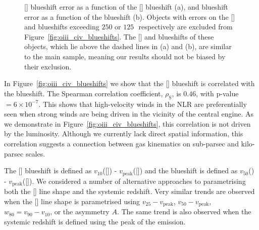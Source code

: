 \begin{figure}
\captionsetup[subfigure]{labelformat=empty}
\centering 
    \subfloat[\label{fig:oiii_civ_blueshifts_a}]{}
    \subfloat[\label{fig:oiii_civ_blueshifts_b}]{}
    \caption[{Objects excluded from Figure~\ref{fig:oiii_civ_blueshifts}.}]{[] blueshift error as a function of the [] blueshift (a), and  blueshift error as a function of the  blueshift (b). Objects with errors on the [] and  blueshifts exceeding $250$ or $125$\,\kms\, respectively are excluded from Figure~\ref{fig:oiii_civ_blueshifts}. The [] and  blueshifts of these objects, which lie above the dashed lines in (a) and (b), are similar to the main sample, meaning our results should not be biased by their exclusion.}
    \label{fig:oiii_civ_blueshifts_flagged}
\end{figure}

In Figure~\ref{fig:oiii_civ_blueshifts} we show that the [] blueshift is correlated with the  blueshift.
The Spearman correlation coefficient, $\rho_{\text{S}}$, is $0.46$, with p-value $=6\times10^{-7}$. 
This shows that high-velocity winds in the NLR are preferentially seen when strong winds are being driven in the vicinity of the central engine. 
As we demonstrate in Figure~\ref{fig:oiii_civ_blueshifts}, this correlation is not driven by the luminosity. 
Although we currently lack direct spatial information, this correlation suggests a connection between gas kinematics on sub-parsec and kilo-parsec scales. 

The [] blueshift is defined as $v_{10}$([]) - $v_{\text{peak}}$([]) and the  blueshift is defined as $v_{50}$() - $v_{\text{peak}}$([]).
We considered a number of alternative approaches to parametrising both the [] line shape and the systemic redshift. 
Very similar trends are observed when the [] line shape is parametrised using $v_{25} - v_{\text{peak}}$, $v_{50} - v_{\text{peak}}$, $w_{80} = v_{90} - v_{10}$, or the asymmetry $A$.
The same trend is also observed when the systemic redshift is defined using the peak of the \hb emission. 

